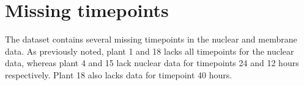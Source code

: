 \section{Missing timepoints}
The dataset contains several missing timepoints in the nuclear and membrane
data. As previously noted, plant 1 and 18 lacks all timepoints for the nuclear
data, whereas plant 4 and 15 lack nuclear data for timepoints 24 and 12 hours
respectively. Plant 18 also lacks data for timepoint 40 hours.

